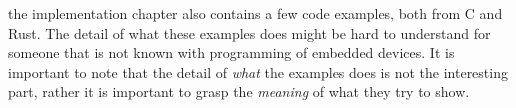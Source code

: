 
the implementation chapter also contains a few code examples, both from C and Rust.
The detail of what these examples does might be hard to understand for someone that is not known with programming of embedded devices.
It is important to note that the detail of \emph{what} the examples does is not the interesting part, rather it is important to grasp the \emph{meaning} of what they try to show.